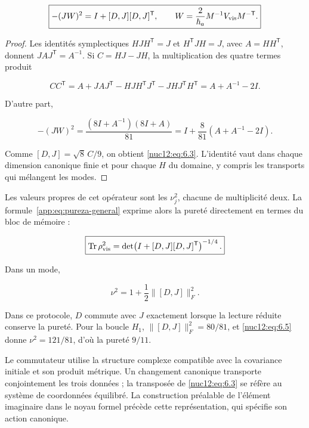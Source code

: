 \begin{equation}
\boxed{-(JW)^2=I+[D,J][D,J]^{\mathsf T},\qquad
W=\frac{2}{\hbar_a}M^{-1}V_{\rm vis}M^{-\mathsf T}.}
\label{nuc12:eq:6.3}
\end{equation}



\begin{proof}
Les identités symplectiques \(HJH^{\mathsf T}=J\) et \(H^{\mathsf T}JH=J\), avec \(A=HH^{\mathsf T}\), donnent \(JAJ^{\mathsf T}=A^{-1}\). Si \(C=HJ-JH\), la multiplication des quatre termes produit




\[
CC^{\mathsf T}
=A+JAJ^{\mathsf T}
-HJH^{\mathsf T}J^{\mathsf T}
-JHJ^{\mathsf T}H^{\mathsf T}
=A+A^{-1}-2I.
\]



D'autre part,



\[
-(JW)^2
=\frac{(8I+A^{-1})(8I+A)}{81}
=I+\frac8{81}(A+A^{-1}-2I).
\]



Comme \([D,J]=\sqrt8\,C/9\), on obtient \eqref{nuc12:eq:6.3}. L’identité vaut dans chaque dimension canonique finie et pour chaque \(H\) du domaine, y compris les transports qui mélangent les modes.
\end{proof}

Les valeurs propres de cet opérateur sont les \(\nu_j^2\), chacune de multiplicité deux. La formule~\eqref{app:eq:pureza-general} exprime alors la pureté directement en termes du bloc de mémoire :




\begin{equation}
\boxed{\operatorname{Tr}\rho_{\rm vis}^2
=\det\!\left(I+[D,J][D,J]^{\mathsf T}\right)^{-1/4}.}
\label{nuc12:eq:6.4}
\end{equation}



Dans un mode,



\begin{equation}
\nu^2=1+\frac12\|[D,J]\|_F^2.
\label{nuc12:eq:6.5}
\end{equation}



Dans ce protocole, \(D\) commute avec \(J\) exactement lorsque la lecture réduite conserve la pureté. Pour la boucle \(H_1\), \(\|[D,J]\|_F^2=80/81\), et \eqref{nuc12:eq:6.5} donne \(\nu^2=121/81\), d’où la pureté \(9/11\).

Le commutateur utilise la structure complexe compatible avec la covariance initiale et son produit métrique. Un changement canonique transporte conjointement les trois données ; la transposée de \eqref{nuc12:eq:6.3} se réfère au système de coordonnées équilibré. La construction préalable de l’élément imaginaire dans le noyau formel précède cette représentation, qui spécifie son action canonique.

